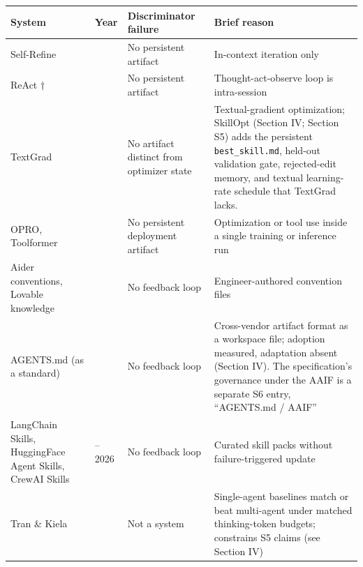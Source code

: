 \documentclass[
]{article}
\newcounter{none} %
\begin{document}
{\def\LTcaptype{none} %
\begin{longtable}[]{@{}
  >{\raggedright\arraybackslash}p{}
  >{\raggedright\arraybackslash}p{}
  >{\raggedright\arraybackslash}p{}
  >{\raggedright\arraybackslash}p{}@{}}
\toprule\noalign{}
\begin{minipage}[b]{\linewidth}\raggedright
System
\end{minipage} & \begin{minipage}[b]{\linewidth}\raggedright
Year
\end{minipage} & \begin{minipage}[b]{\linewidth}\raggedright
Discriminator failure
\end{minipage} & \begin{minipage}[b]{\linewidth}\raggedright
Brief reason
\end{minipage} \\
\midrule\noalign{}
\endhead
\bottomrule\noalign{}
\endlastfoot
Self-Refine \cite{madaan2023selfrefine} & 2023 & No persistent artifact
& In-context iteration only \\
ReAct \cite{yao2023react}† & 2023 & No persistent artifact &
Thought-act-observe loop is intra-session \\
TextGrad \cite{yuksekgonul2024textgrad} & 2024 & No artifact distinct
from optimizer state & Textual-gradient optimization; SkillOpt
\cite{yang2026skillopt} (Section IV; Section S5) adds the persistent
\texttt{best\_skill.md}, held-out validation gate, rejected-edit memory,
and textual learning-rate schedule that TextGrad lacks. \\
OPRO, Toolformer & 2023 & No persistent deployment artifact &
Optimization or tool use inside a single training or inference run \\
Aider conventions, Lovable knowledge & 2024 & No feedback loop &
Engineer-authored convention files \\
AGENTS.md (as a standard) & 2025 & No feedback loop & Cross-vendor
artifact format as a workspace file; adoption measured, adaptation
absent (Section IV). The specification's governance under the AAIF is a
separate S6 entry, ``AGENTS.md / AAIF'' \\
LangChain Skills, HuggingFace Agent Skills, CrewAI Skills & 2025--2026 &
No feedback loop & Curated skill packs without failure-triggered
update \\
Tran \& Kiela \cite{tran2026singleagent} & 2026 & Not a system &
Single-agent baselines match or beat multi-agent under matched
thinking-token budgets; constrains S5 claims (see Section IV) \\
\end{longtable}
}
\end{document}
